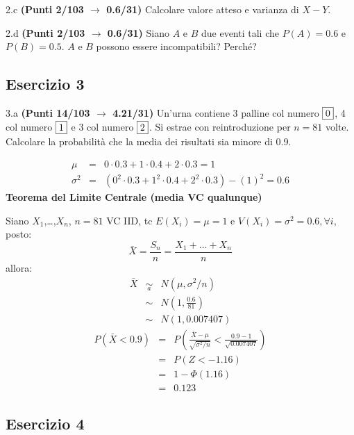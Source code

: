 \documentclass[
  11pt,
]{book}
\theoremstyle{mytheoremstyle}
\theoremstyle{mydefstyle}
\newenvironment{sol}
  {
  \begin{tcolorbox}[enhanced,breakable,arc=0.1mm,boxrule=1pt,colback=white,colframe=iblue,
  title=\bf \fontfamily{lmss}\selectfont \hspace{.5 cm} Soluzione,drop fuzzy shadow]

}{
\end{tcolorbox}
  }
\begin{document}
2.c \textbf{(Punti 2/103 \(\rightarrow\) 0.6/31)} Calcolare valore atteso e varianza di \(X-Y\).

2.d \textbf{(Punti 2/103 \(\rightarrow\) 0.6/31)} Siano \(A\) e \(B\) due eventi tali che \(P(A)=0.6\) e \(P(B)=0.5\). \(A\) e \(B\) possono essere incompatibili? Perché?

\subsection{Esercizio 3}\label{esercizio-3-26}

3.a \textbf{(Punti 14/103 \(\rightarrow\) 4.21/31)} Un'urna contiene 3 palline col numero \(\fbox{0}\), 4 col numero \(\fbox{1}\) e 3 col numero \(\fbox{2}\). Si estrae con reintroduzione per \(n=81\) volte.
Calcolare la probabilità che la media dei risultati sia minore di 0.9.

\begin{sol}
\begin{eqnarray*}
 \mu &=&  0  \cdot 0.3+ 1  \cdot 0.4+ 2  \cdot 0.3 = 1 \\ \sigma^2 &=&(  0 ^2 \cdot 0.3+ 1 ^2 \cdot 0.4+ 2 ^2 \cdot 0.3 )-( 1 )^2= 0.6 \end{eqnarray*}\textbf{Teorema del Limite Centrale (media VC qualunque)}

Siano \(X_1\),\ldots,\(X_n\), \(n=81\) VC IID, tc \(E(X_i)=\mu=1\) e \(V(X_i)=\sigma^2=0.6,\forall i\), posto:
\[
      \bar X=\frac{S_n}n =\frac{X_1 + ... + X_n}n
      \]
allora:\begin{eqnarray*}
  \bar X & \mathop{\sim}\limits_{a}& N(\mu,\sigma^2/n) \\
     &\sim & N\left(1,\frac{0.6}{81}\right) \\
     &\sim & N(1,0.007407)
  \end{eqnarray*}\begin{eqnarray*}
      P( \bar X   <   0.9 ) 
        &=& P\left(  \frac { \bar X  -  \mu }{ \sqrt{\sigma^2/n} }  <  \frac { 0.9  -  1 }{\sqrt{ 0.007407 }} \right)  \\
                 &=& P\left(  Z   <   -1.16 \right) \\    
                 &=&  1-\Phi( 1.16 ) \\ &=&  0.123 
      \end{eqnarray*}

\end{sol}

\subsection{Esercizio 4}\label{esercizio-4-26}
\end{document}

